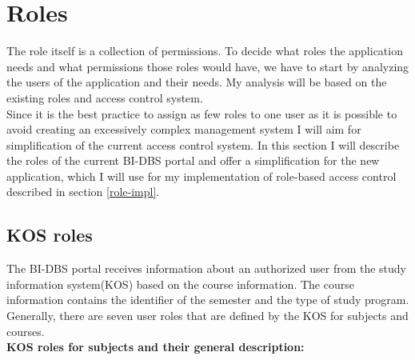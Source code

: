 \section{Roles} The role itself is a collection of permissions. To decide what roles the application needs and what permissions those roles would have, we have to start by analyzing the users of the application and their needs. My analysis will be based on the existing roles and access control system.\\
Since it is the best practice to assign as few roles to one user as it is possible \cite{role-auth} to avoid creating an excessively complex management system I will aim for simplification of the current access control system. In this section I will describe the roles of the current BI-DBS portal and offer a simplification for the new application, which I will use for my implementation of role-based access control described in section \ref{role-impl}.

\subsection{KOS roles}
The BI-DBS portal receives information about an authorized user from the study information system(KOS) based on the course information. The course information contains the identifier of the semester and the type of study program. Generally, there are seven user roles that are defined by the KOS for subjects and courses. \cite{kosapi}\\

\noindent \textbf{KOS roles for subjects and their general description: \cite{kosroles}}

